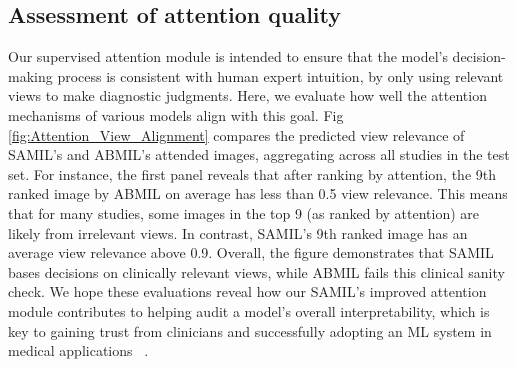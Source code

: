 

\subsection{Assessment of attention quality}

Our supervised attention module is intended to ensure that the model's decision-making process is consistent with human expert intuition, by only using relevant views to make diagnostic judgments.
Here, we evaluate how well the attention mechanisms of various models align with this goal. 
Fig \ref{fig:Attention_View_Alignment} compares the predicted view relevance of SAMIL's and ABMIL's attended images, aggregating across all studies in the test set. For instance, the first panel reveals that after ranking by attention, the 9th ranked image by ABMIL on average has less than 0.5 view relevance. This means that for many studies, some images in the top 9 (as ranked by attention) are likely from irrelevant views. In contrast, SAMIL's 9th ranked image has an average view relevance above 0.9.
Overall, the figure demonstrates that SAMIL bases decisions on clinically relevant views, while ABMIL fails this clinical sanity check. 
We hope these evaluations reveal how our SAMIL's improved attention module contributes to helping audit a model's overall interpretability, which is key to gaining trust from clinicians and successfully adopting an ML system in medical applications ~\citep{holzinger2017we, lundberg2017unified, tonekaboni2019clinicians}. 



